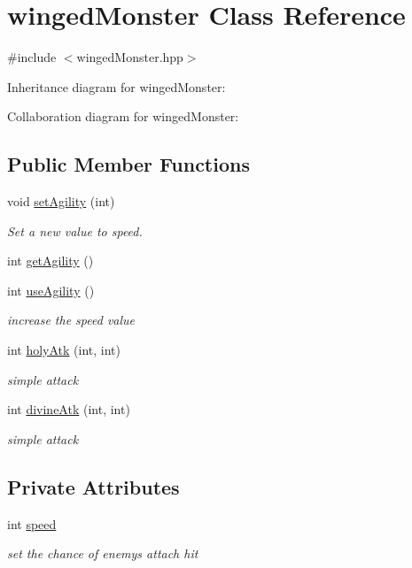 \hypertarget{classwingedMonster}{}\section{winged\+Monster Class Reference}
\label{classwingedMonster}


{\ttfamily \#include $<$winged\+Monster.\+hpp$>$}



Inheritance diagram for winged\+Monster\+:


Collaboration diagram for winged\+Monster\+:
\subsection*{Public Member Functions}
\begin{DoxyCompactItemize}
\item 
void \hyperlink{classwingedMonster_ad56d44ed19992378309c42fb20f870eb}{set\+Agility} (int)
\begin{DoxyCompactList}\small\item\em Set a new value to speed. \end{DoxyCompactList}\item 
int \hyperlink{classwingedMonster_a008ef0877b79c3aa4d77149651fe7a5d}{get\+Agility} ()
\item 
int \hyperlink{classwingedMonster_ac0e604155a59012e1aa8421c2057db61}{use\+Agility} ()
\begin{DoxyCompactList}\small\item\em increase the speed value \end{DoxyCompactList}\item 
int \hyperlink{classwingedMonster_a9da3182adcc51776859badc11e6c79bb}{holy\+Atk} (int, int)
\begin{DoxyCompactList}\small\item\em simple attack \end{DoxyCompactList}\item 
int \hyperlink{classwingedMonster_a518a4ba24563d103a6cf1b8367e2ba16}{divine\+Atk} (int, int)
\begin{DoxyCompactList}\small\item\em simple attack \end{DoxyCompactList}\end{DoxyCompactItemize}
\subsection*{Private Attributes}
\begin{DoxyCompactItemize}
\item 
int \hyperlink{classwingedMonster_add58e2ea67dc81c40d2194b4f6f152a4}{speed}
\begin{DoxyCompactList}\small\item\em set the chance of enemy\textquotesingle{}s attach hit \end{DoxyCompactList}\end{DoxyCompactItemize}
